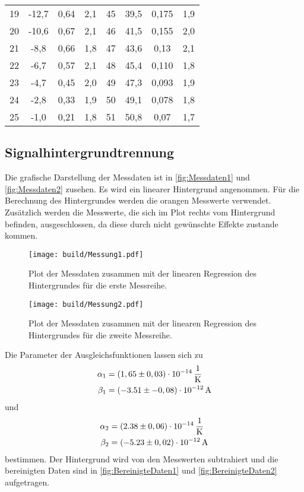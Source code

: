 \begin{table}[H]
\begin{tabular}{c c c c c c c c}
        19  &-12,7   &0,64    & 2,1&45  &39,5   & 0,175 & 1,9 \\
        20  &-10,6   &0,67    & 2,1&46  &41,5   & 0,155 & 2,0 \\
        21  &-8,8    &0,66    & 1,8&47  &43,6   & 0,13  & 2,1\\
        22  &-6,7    &0,57    & 2,1&48  &45,4   & 0,110 & 1,8 \\
        23  &-4,7    &0,45    & 2,0&49  &47,3   & 0,093 & 1,9 \\
        24  &-2,8    &0,33    & 1,9&50  &49,1   & 0,078 & 1,8 \\
        25  &-1,0    &0,21    & 1,8&51  &50,8   & 0,07  & 1,7\\
        \bottomrule
        \end{tabular}
        \end{table}
  
  

\subsection{Signalhintergrundtrennung}
\label{sec:Signalhintergrundtrennung}
        
Die grafische Darstellung der Messdaten ist in \autoref{fig:Messdaten1} und \autoref{fig:Messdaten2} zusehen.
Es wird ein linearer Hintergrund angenommen. Für die Berechnung des Hintergrundes werden die orangen Messwerte verwendet.
Zusätzlich werden die Messwerte, die sich im Plot rechts vom Hintergrund befinden, ausgeschlossen, da diese durch nicht gewünschte Effekte zustande kommen. 
\begin{figure}[H]
    \centering
    \texttt{[image: build/Messung1.pdf]}
    \caption{Plot der Messdaten zusammen mit der linearen Regression des Hintergrundes für die erste Messreihe.}
    \label{fig:Messdaten1}
\end{figure}
\begin{figure}[H]
    \centering
    \texttt{[image: build/Messung2.pdf]}
    \caption{Plot der Messdaten zusammen mit der linearen Regression des Hintergrundes für die zweite Messreihe.}
    \label{fig:Messdaten2}
\end{figure}
Die Parameter der Ausgleichsfunktionen lassen sich zu 
\begin{align*}
    \alpha_1 &=         (1,65 \pm 0,03 ) \cdot 10^{-14} \,\unit{\dfrac{1}{\kelvin}} \\
    \beta_1  &=         (-3.51 \pm-0,08) \cdot 10^{-12} \,\unit{\ampere} 
\end{align*}
und 
\begin{align*}
    \alpha_2 &=         ( 2.38 \pm 0,06 ) \cdot 10^{-14}  \,\unit{\dfrac{1}{\kelvin}} \\
    \beta_2  &=         (-5.23 \pm 0,02 ) \cdot 10^{-12} \,\unit{\ampere} 
\end{align*}
bestimmen.
Der Hintergrund wird von den Messwerten subtrahiert und die bereinigten Daten sind in 
\autoref{fig:BereinigteDaten1} und \autoref{fig:BereinigteDaten2} aufgetragen.

